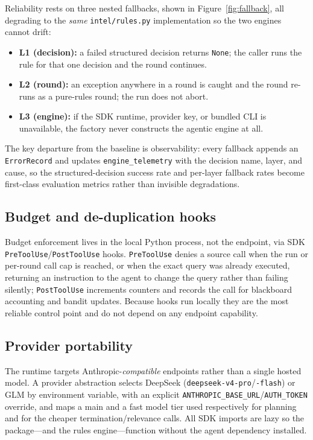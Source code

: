 \documentclass[conference]{IEEEtran}
\newcommand{\code}[1]{\texttt{\small #1}}
\begin{document}
Reliability rests on three nested fallbacks, shown in Figure~\ref{fig:fallback}, all degrading to the \emph{same} \code{intel/rules.py} implementation so the two engines cannot drift:
\begin{itemize}
  \item \textbf{L1 (decision):} a failed structured decision returns \code{None}; the caller runs the rule for that one decision and the round continues.
  \item \textbf{L2 (round):} an exception anywhere in a round is caught and the round re-runs as a pure-rules round; the run does not abort.
  \item \textbf{L3 (engine):} if the SDK runtime, provider key, or bundled CLI is unavailable, the factory never constructs the agentic engine at all.
\end{itemize}
The key departure from the baseline is observability: every fallback appends an \code{ErrorRecord} and updates \code{engine\_telemetry} with the decision name, layer, and cause, so the structured-decision success rate and per-layer fallback rates become first-class evaluation metrics rather than invisible degradations.

\subsection{Budget and de-duplication hooks}

Budget enforcement lives in the local Python process, not the endpoint, via SDK \code{PreToolUse}/\code{PostToolUse} hooks. \code{PreToolUse} denies a source call when the run or per-round call cap is reached, or when the exact query was already executed, returning an instruction to the agent to change the query rather than failing silently; \code{PostToolUse} increments counters and records the call for blackboard accounting and bandit updates. Because hooks run locally they are the most reliable control point and do not depend on any endpoint capability.

\subsection{Provider portability}

The runtime targets Anthropic-\emph{compatible} endpoints rather than a single hosted model. A provider abstraction selects DeepSeek (\code{deepseek-v4-pro}/\code{-flash}) or GLM by environment variable, with an explicit \code{ANTHROPIC\_BASE\_URL}/\code{AUTH\_TOKEN} override, and maps a main and a fast model tier used respectively for planning and for the cheaper termination/relevance calls. All SDK imports are lazy so the package---and the rules engine---function without the agent dependency installed.
\end{document}
